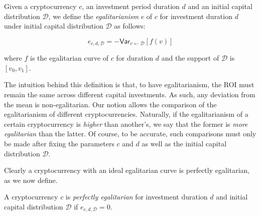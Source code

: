 \begin{definition}[Egalitarianism]
  Given a cryptocurrency $c$, an investment period duration $d$ and an initial
  capital distribution $\mathcal{D}$, we define the \emph{egalitarianism} $e$ of $c$
  for investment duration $d$ under initial capital distribution $\mathcal{D}$
  as follows:

  \[
    e_{c,d,\mathcal{D}} = -\textsf{Var}_{v \gets \mathcal{D}}[f(v)]
  \]

  where $f$ is the egalitarian curve of $c$ for duration $d$ and the support of
  $\mathcal{D}$ is $[v_0, v_1]$.
\end{definition}

The intuition behind this definition is that, to have egalitarianism, the ROI
must remain the same across different capital investments. As such, any
deviation from the mean is non-egalitarian. Our notion allows the comparison of
the egalitarianism of different cryptocurrencies. Naturally, if the
egalitarianism of a certain cryptocurrency is \emph{higher} than another's, we
say that the former is \emph{more egalitarian} than the latter. Of course, to be
accurate, such comparisons must only be made after fixing the parameters $c$
and $d$ as well as the initial capital distribution $\mathcal{D}$.

Clearly a cryptocurrency with an ideal egalitarian curve is perfectly
egalitarian, as we now define.

\begin{definition}
  A cryptocurrency $c$ is \emph{perfectly egalitarian} for investment duration
  $d$ and initial capital distribution $\mathcal{D}$ if
  $e_{c,d,\mathcal{D}} = 0$.
\end{definition}
